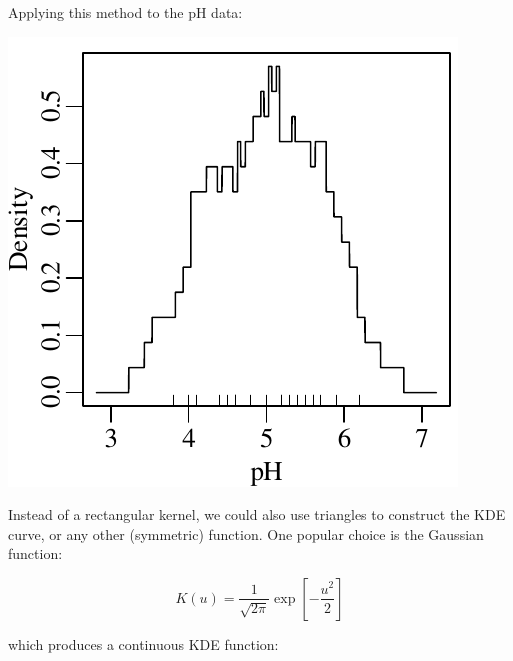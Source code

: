 Applying this method to the pH data:

\noindent\begin{minipage}[t][][b]{.3\textwidth}
  \includegraphics[width=\textwidth]{../figures/pHrectKDE.pdf}
\end{minipage}
\begin{minipage}[t][][t]{.7\textwidth}
  \label{fig:pHrectKDE}
\end{minipage}

Instead of a rectangular kernel, we could also use triangles to
construct the KDE curve, or any other (symmetric) function. One
popular choice is the Gaussian function:

\begin{equation}
  K(u) = \frac{1}{\sqrt{2\pi}}\exp\!\left[-\frac{u^2}{2}\right]
  \label{eq:gaussiankernel}
\end{equation}

\noindent which produces a continuous KDE function:\\

